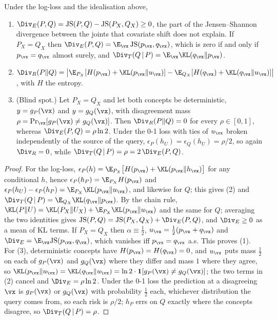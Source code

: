 \begin{proposition}\label{prop:blind}
Under the log-loss and the idealisation above,
\begin{enumerate}
  \item $\Div_E(P,Q)=\mathrm{JS}(P,Q)-\mathrm{JS}(P_X,Q_X)\ge0$, the part of the Jensen--Shannon divergence between
        the joints that covariate shift does not explain. If $P_X=Q_X$ then
        $\Div_E(P,Q)=\E_{\vx}\,\mathrm{JS}(p_\vx,q_\vx)$, which is zero if and only if $p_\vx=q_\vx$ almost surely,
        and $\Div_T(Q\,|\,P)=\E_{\vx}\KL(q_\vx\|p_\vx)$.
  \item $\Div_R(P\|Q)=\bigl|\E_{P_X}[H(p_\vx)+\KL(p_\vx\|u_\vx)]-\E_{Q_X}[H(q_\vx)+\KL(q_\vx\|u_\vx)]\bigr|$, with $H$
        the entropy.
  \item (Blind spot.) Let $P_X=Q_X$ and let both concepts be deterministic, $y=g_P(\vx)$ and $y=g_Q(\vx)$, with
        disagreement mass $\rho=\Pr_{\vx}[g_P(\vx)\neq g_Q(\vx)]$. Then $\Div_R(P\|Q)=0$ for every $\rho\in[0,1]$,
        whereas $\Div_E(P,Q)=\rho\ln2$. Under the 0-1 loss with ties of $u_\vx$ broken independently of the source
        of the query, $\epsilon_P(h_U)=\epsilon_Q(h_U)=\rho/2$, so again $\Div_R=0$, while
        $\Div_T(Q\,|\,P)=\rho=2\,\Div_E(P,Q)$.
\end{enumerate}
\end{proposition}

\begin{proof}
For the log-loss, $\epsilon_P(h)=\E_{P_X}\bigl[H(p_\vx)+\KL(p_\vx\|h_\vx)\bigr]$ for any conditional $h$, hence
$\epsilon_P(h_P)=\E_{P_X}H(p_\vx)$ and $\epsilon_P(h_U)-\epsilon_P(h_P)=\E_{P_X}\KL(p_\vx\|u_\vx)$, and likewise for $Q$;
this gives (2) and $\Div_T(Q\,|\,P)=\E_{Q_X}\KL(q_\vx\|p_\vx)$. By the chain rule,
$\KL(P\|U)=\KL(P_X\|U_X)+\E_{P_X}\KL(p_\vx\|u_\vx)$ and the same for $Q$; averaging the two identities gives
$\mathrm{JS}(P,Q)=\mathrm{JS}(P_X,Q_X)+\Div_E(P,Q)$, and $\Div_E\ge0$ as a mean of KL terms. If $P_X=Q_X$ then
$\alpha\equiv\tfrac12$, $u_\vx=\tfrac12(p_\vx+q_\vx)$ and $\Div_E=\E_\vx\mathrm{JS}(p_\vx,q_\vx)$, which vanishes iff
$p_\vx=q_\vx$ a.s. This proves (1). For (3), deterministic concepts have $H(p_\vx)=H(q_\vx)=0$, and
$u_\vx$ puts mass $\tfrac12$ on each of $g_P(\vx)$ and $g_Q(\vx)$ where they differ and mass $1$ where they agree, so
$\KL(p_\vx\|u_\vx)=\KL(q_\vx\|u_\vx)=\ln2\cdot\mathbf 1[g_P(\vx)\neq g_Q(\vx)]$; the two terms in (2) cancel and
$\Div_E=\rho\ln2$. Under the 0-1 loss the prediction at a disagreeing $\vx$ is $g_P(\vx)$ or $g_Q(\vx)$ with probability
$\tfrac12$ each, whichever distribution the query comes from, so each risk is $\rho/2$; $h_P$ errs on $Q$ exactly where
the concepts disagree, so $\Div_T(Q\,|\,P)=\rho$.
\end{proof}

